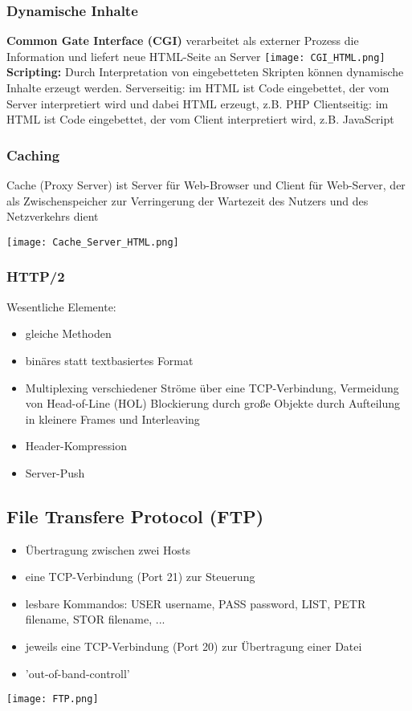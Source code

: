 		\subsubsection{Dynamische Inhalte}
			\textbf{Common Gate Interface (CGI)} verarbeitet als externer Prozess die Information und liefert neue HTML-Seite an Server \newline \newline
			\texttt{[image: CGI\_HTML.png]}
			\newline
			\textbf{Scripting:} Durch Interpretation von eingebetteten Skripten können dynamische Inhalte erzeugt werden.\newline \newline
			Serverseitig: im HTML ist Code eingebettet, der vom Server interpretiert wird und dabei HTML erzeugt, z.B. PHP \newline \newline
			Clientseitig: im HTML ist Code eingebettet, der vom Client interpretiert wird, z.B. JavaScript
		\subsubsection{Caching}
			Cache (Proxy Server) ist Server für Web-Browser und Client für Web-Server, der als Zwischenspeicher zur Verringerung der Wartezeit des Nutzers und des Netzverkehrs dient
			\begin{center}
				\texttt{[image: Cache\_Server\_HTML.png]}
			\end{center}
		\subsubsection{HTTP/2}
			Wesentliche Elemente: 
			\begin{itemize}
				\item gleiche Methoden
				\item binäres statt textbasiertes Format
				\item Multiplexing verschiedener Ströme über eine TCP-Verbindung, Vermeidung von Head-of-Line (HOL) Blockierung durch große Objekte durch Aufteilung in kleinere Frames und Interleaving
				\item Header-Kompression
				\item Server-Push
			\end{itemize}
	\subsection{File Transfere Protocol (FTP)}
		\begin{itemize}
			\item Übertragung zwischen zwei Hosts
			\item eine TCP-Verbindung (Port 21) zur Steuerung
			\item lesbare Kommandos: USER username, PASS password, LIST, PETR filename, STOR filename, ...
			\item jeweils eine TCP-Verbindung (Port 20) zur  Übertragung einer Datei
			\item 'out-of-band-controll'
		\end{itemize}
		\begin{center}
			\texttt{[image: FTP.png]}
		\end{center}
